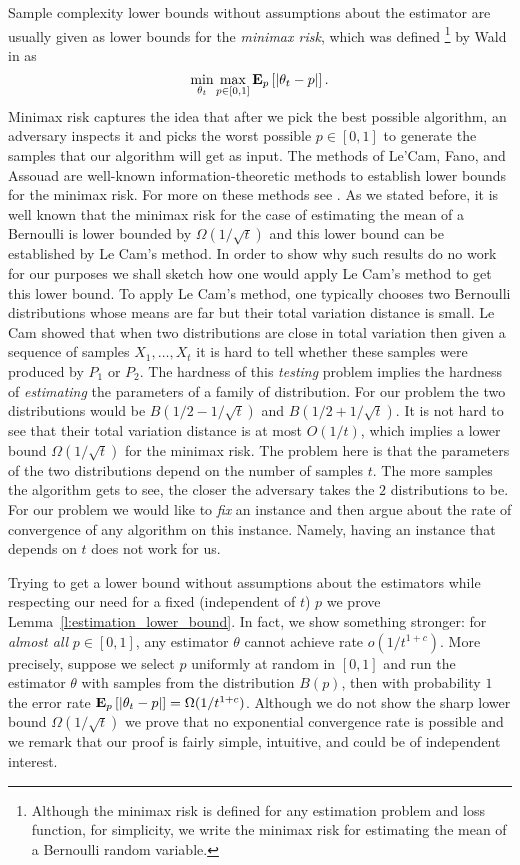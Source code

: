 Sample complexity lower bounds without assumptions about the estimator are usually
given as lower bounds for the \emph{minimax risk}, which was defined
\footnote{
  Although the minimax risk is defined for any estimation problem and loss
  function, for simplicity, we write the minimax risk for estimating the mean
  of a Bernoulli random variable.}
by Wald in \cite{Wal39} as
\[
  \min_{\theta_t} \max_{p\in[0,1]} \bm{\mathrm{E}}_{p} \left[ |\theta_t - p| \right].
\]
\noindent Minimax risk captures the idea that after we pick the best possible
algorithm, an adversary inspects it and picks the worst possible
$p \in[0,1]$ to generate the samples that our algorithm will get as input.
The methods of Le'Cam, Fano, and Assouad are well-known
information-theoretic methods to establish lower bounds for the minimax risk.
For more on these methods see \cite{Yu97,Tsy08}.
As we stated before, it is well known that the minimax risk for the
case of estimating the mean of a Bernoulli is lower bounded by
$\Omega(1/\sqrt{t})$ and this lower bound can be established
by Le Cam's method.
In order to show why such results do no work for our purposes
we shall sketch how one would apply Le Cam's method to get this lower bound.
To apply Le Cam's method, one typically chooses two Bernoulli distributions
whose means are far but their total variation distance is small.
Le Cam showed that when two distributions are close in total variation then
given a sequence of samples $X_1, \ldots, X_t$ it is hard to tell whether
these samples were produced by $P_1$ or $P_2$. The hardness of this \emph{testing}
problem implies the hardness of \emph{estimating} the parameters of
a family of distribution.
For our problem the two distributions would be $B(1/2 - 1/\sqrt{t})$
and $B(1/2 + 1/\sqrt{t})$. It is not hard to see that their total variation
distance is at most $O(1/t)$, which implies a lower bound
$\Omega(1/\sqrt{t})$ for the minimax risk. The problem here is that
the parameters of the two distributions depend on the number of
samples $t$. The more samples the algorithm gets to see, the closer
the adversary takes the $2$ distributions to be.
For our problem we would like to \emph{fix} an instance and then argue
about the rate of convergence of any algorithm on this instance.
Namely, having an instance that depends on $t$ does not work for us.

Trying to get a lower bound without assumptions about the estimators
while respecting our need for a fixed (independent of $t$) $p$ we prove
Lemma~\ref{l:estimation_lower_bound}.
In fact, we show something stronger:
for \emph{almost all} $p \in [0,1]$, any estimator $\theta$ cannot
achieve rate $o(1/t^{1+c})$.
More precisely,  suppose we select $p$ uniformly at
random in $[0,1]$ and run the estimator $\theta$ with samples from the
distribution $B(p)$, then with probability $1$ the error rate
$\bm{\mathrm{E}}_{p} \left[ |\theta_t  - p | \right] = \Omega(1/t^{1+c})$. Although we do not show the sharp lower bound
$\Omega(1/\sqrt{t})$ we prove that no exponential convergence rate
is possible and we remark that our proof is fairly simple, intuitive,
and could be of independent interest.
%

